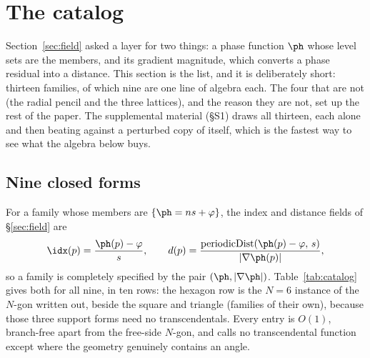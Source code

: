 \section{The catalog}
\label{sec:catalog}

Section~\ref{sec:field} asked a layer for two things: a phase function $\ph$ whose
level sets are the members, and its gradient magnitude, which converts a phase
residual into a distance. This section is the list, and it is deliberately short:
thirteen families, of which nine are one line of algebra each. The four that
are not (the radial pencil and the three lattices), and the reason they
are not, set up the rest of the paper.
The supplemental material (\S S1) draws all thirteen, each alone and then beating
against a perturbed copy of itself, which is the fastest way to see what the
algebra below buys.

\subsection{Nine closed forms}

For a family whose members are $\{\ph=ns+\varphi\}$, the index and distance fields
of \S\ref{sec:field} are
\begin{equation}
  \idx(p)=\frac{\ph(p)-\varphi}{s},
  \qquad
  d(p)=\frac{\mathrm{periodicDist}\!\left(\ph(p)-\varphi,\,s\right)}{\lvert\nabla\ph(p)\rvert},
  \label{eq:closedpair}
\end{equation}
so a family is completely specified by the pair $(\ph,\lvert\nabla\ph\rvert)$.
Table~\ref{tab:catalog} gives both for all nine, in ten rows: the hexagon row
is the $N{=}6$ instance of the $N$-gon written out, beside the square and
triangle (families of their own), because those three support forms need no
transcendentals. Every entry is $O(1)$, branch-free
apart from the free-side $N$-gon, and calls no transcendental function except where
the geometry genuinely contains an angle.

